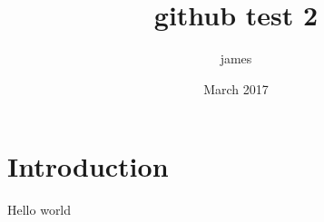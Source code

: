 \documentclass{article}
\title{github test 2}
\author{james }
\date{March 2017}
\begin{document}
\maketitle

\section{Introduction}

Hello world
\end{document}
